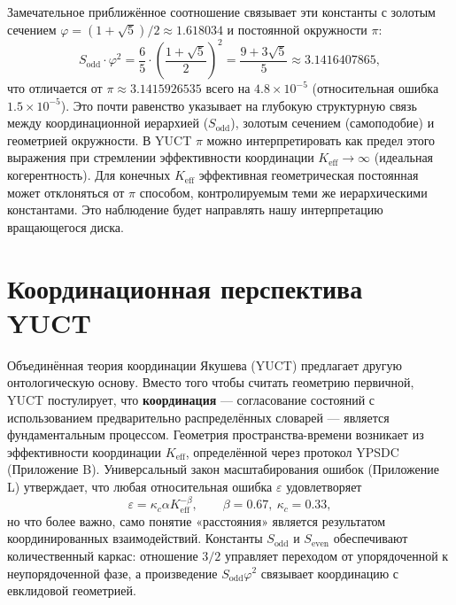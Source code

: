 \documentclass[12pt,a4paper]{article}
\newcommand{\kappac}{\kappa_c}
\newcommand{\eps}{\varepsilon}
\newcommand{\betaf}{\beta}
\newcommand{\Sodd}{S_{\mathrm{odd}}}
\newcommand{\Seven}{S_{\mathrm{even}}}
\begin{document}
	Замечательное приближённое соотношение связывает эти константы с золотым сечением \(\varphi = (1+\sqrt{5})/2 \approx 1.618034\) и постоянной окружности \(\pi\):
	\begin{equation}
		\Sodd \cdot \varphi^2 = \frac{6}{5} \cdot \left(\frac{1+\sqrt{5}}{2}\right)^2 = \frac{9+3\sqrt{5}}{5} \approx 3.1416407865,
	\end{equation}
	что отличается от \(\pi \approx 3.1415926535\) всего на \(4.8\times10^{-5}\) (относительная ошибка \(1.5\times10^{-5}\)). Это почти равенство указывает на глубокую структурную связь между координационной иерархией (\(\Sodd\)), золотым сечением (самоподобие) и геометрией окружности. В YUCT \(\pi\) можно интерпретировать как предел этого выражения при стремлении эффективности координации \(K_{\mathrm{eff}} \to \infty\) (идеальная когерентность). Для конечных \(K_{\mathrm{eff}}\) эффективная геометрическая постоянная может отклоняться от \(\pi\) способом, контролируемым теми же иерархическими константами. Это наблюдение будет направлять нашу интерпретацию вращающегося диска.
	
	\section{Координационная перспектива YUCT}
	\label{sec:yuct}
	
	Объединённая теория координации Якушева (YUCT) предлагает другую онтологическую основу. Вместо того чтобы считать геометрию первичной, YUCT постулирует, что \textbf{координация} — согласование состояний с использованием предварительно распределённых словарей — является фундаментальным процессом. Геометрия пространства-времени возникает из эффективности координации \(K_{\mathrm{eff}}\), определённой через протокол YPSDC (Приложение B). Универсальный закон масштабирования ошибок (Приложение L) утверждает, что любая относительная ошибка \(\eps\) удовлетворяет
	\[
	\eps = \kappac \alpha K_{\mathrm{eff}}^{-\betaf}, \qquad \betaf = 0.67,\ \kappac = 0.33,
	\]
	но что более важно, само понятие «расстояния» является результатом координированных взаимодействий. Константы \(\Sodd\) и \(\Seven\) обеспечивают количественный каркас: отношение \(3/2\) управляет переходом от упорядоченной к неупорядоченной фазе, а произведение \(\Sodd\varphi^2\) связывает координацию с евклидовой геометрией.
	
\end{document}
